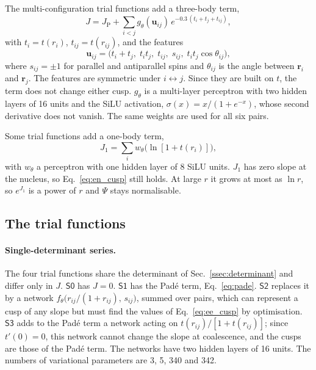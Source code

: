 \documentclass[aps,prb,reprint,amsmath,amssymb,superscriptaddress,nofootinbib]{revtex4-2}
\newcommand{\mS}[1]{\ensuremath{\textsf{S#1}}}
\begin{document}
The multi-configuration trial functions add a three-body term,
\begin{equation}
    J = J_{\mathrm{P}} + \sum_{i<j} g_\theta(\mathbf{u}_{ij})\,
        e^{-0.3\,(t_i + t_j + t_{ij})} ,
    \label{eq:three_body}
\end{equation}
with $t_i = t(r_i)$, $t_{ij} = t(r_{ij})$, and the features
\begin{equation}
    \mathbf{u}_{ij} = \bigl( t_i + t_j,\; t_i t_j,\; t_{ij},\; s_{ij},\;
                      t_i t_j \cos\theta_{ij} \bigr) ,
    \label{eq:features}
\end{equation}
where $s_{ij} = \pm1$ for parallel and antiparallel spins and $\theta_{ij}$ is
the angle between $\mathbf{r}_i$ and $\mathbf{r}_j$. The features are
symmetric under $i \leftrightarrow j$. Since they are built on $t$, the term
does not change either cusp. $g_\theta$ is a multi-layer perceptron with two
hidden layers of 16 units and the SiLU activation, $\sigma(x) = x/(1+e^{-x})$,
whose second derivative does not vanish. The same weights are used for all
six pairs.

Some trial functions add a one-body term,
\begin{equation}
    J_1 = \sum_{i} w_\theta\bigl(\ln[1 + t(r_i)]\bigr) ,
    \label{eq:one_body}
\end{equation}
with $w_\theta$ a perceptron with one hidden layer of 8 SiLU units. $J_1$ has
zero slope at the nucleus, so Eq.~\eqref{eq:en_cusp} still holds. At large
$r$ it grows at most as $\ln r$, so $e^{J_1}$ is a power of $r$ and $\Psi$
stays normalisable.

\subsection{The trial functions}
\label{ssec:models}

\paragraph{Single-determinant series.}
The four trial functions share the determinant of Sec.~\ref{ssec:determinant}
and differ only in $J$. \mS{0} has $J = 0$. \mS{1} has the Pad\'e term,
Eq.~\eqref{eq:pade}. \mS{2} replaces it by a network
$f_\theta\bigl(r_{ij}/(1 + r_{ij}),\, s_{ij}\bigr)$, summed over pairs, which
can represent a cusp of any slope but must find the values of
Eq.~\eqref{eq:ee_cusp} by optimisation. \mS{3} adds to the Pad\'e term a
network acting on $t(r_{ij})/[1 + t(r_{ij})]$; since $t'(0) = 0$, this network
cannot change the slope at coalescence, and the cusps are those of the Pad\'e
term. The networks have two hidden layers of 16 units. The numbers of
variational parameters are 3, 5, 340 and 342.
\end{document}
